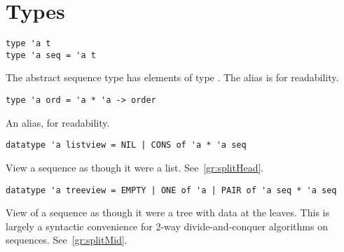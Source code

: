 \section{Types}
\label{sec:seq-interface::types}

\begin{cluster}
\label{grp:grm:seq-interface::type}

\begin{gram}
\label{grm:seq-interface::type}
\begin{verbatim}
type 'a t
type 'a seq = 'a t
\end{verbatim}
The abstract sequence type  has elements of type . The alias
 is for readability.

\end{gram}
\end{cluster}

\begin{cluster}
\label{grp:grm:seq-interface::order}

\begin{gram}
\label{grm:seq-interface::order}
\begin{verbatim}
type 'a ord = 'a * 'a -> order
\end{verbatim}
An alias, for readability.

\end{gram}
\end{cluster}

\begin{cluster}
\label{grp:grm:seq-interface::listview}

\begin{gram}
\label{grm:seq-interface::listview}
\begin{verbatim}
datatype 'a listview = NIL | CONS of 'a * 'a seq
\end{verbatim}
View a sequence as though it were a list. See~\ref{gr:splitHead}.

\end{gram}
\end{cluster}

\begin{cluster}
\label{grp:grm:seq-interface::treeview}

\begin{gram}
\label{grm:seq-interface::treeview}
\begin{verbatim}
datatype 'a treeview = EMPTY | ONE of 'a | PAIR of 'a seq * 'a seq
\end{verbatim}
View of a sequence as though it were a tree with data at the leaves.
This is largely a syntactic convenience for 2-way divide-and-conquer algorithms
on sequences. See~\ref{gr:splitMid}.

\end{gram}
\end{cluster}



